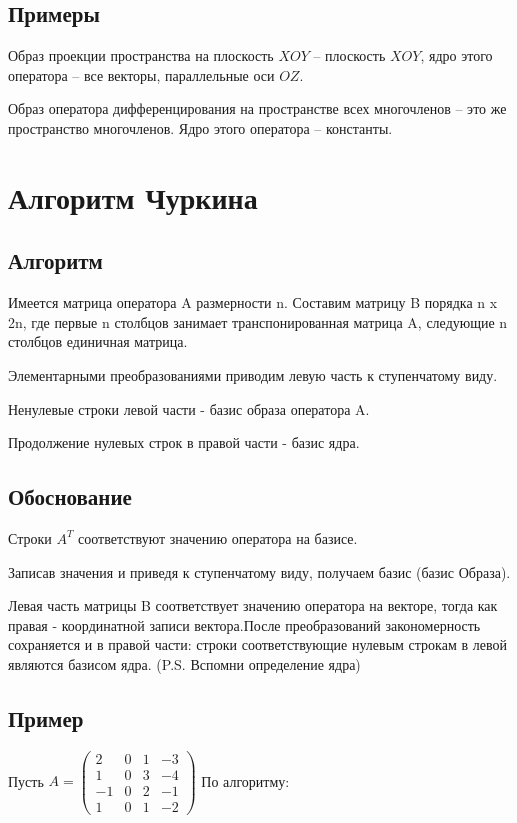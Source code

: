 \documentclass[12pt]{article}
\begin{document}
\subsection{Примеры}
Образ проекции пространства на плоскость $XOY$ – плоскость $XOY$, ядро этого оператора – все векторы, параллельные оси $OZ$.

Образ оператора дифференцирования на пространстве всех многочленов – это же пространство многочленов. Ядро этого оператора – константы.

\section{Алгоритм Чуркина}
\subsection{Алгоритм}
Имеется матрица оператора A размерности n. Составим матрицу B порядка n x 2n, где первые n столбцов занимает транспонированная матрица A, следующие n столбцов единичная матрица.

Элементарными преобразованиями приводим левую часть к ступенчатому виду.

Ненулевые строки левой части - базис образа оператора A.

Продолжение нулевых строк в правой части - базис ядра.

\subsection{Обоснование}
Строки $A^T$ соответствуют значению оператора на базисе.

Записав значения и приведя к ступенчатому виду, получаем базис (базис Образа).

Левая часть матрицы B соответствует значению оператора на векторе, тогда как правая - координатной записи вектора.После преобразований закономерность сохраняется и в правой части: строки соответствующие нулевым строкам в левой являются базисом ядра. (P.S. Вспомни определение ядра)

\subsection{Пример}
Пусть $A = \left(\begin{array}{cccc}
            2  & 0 & 1 & -3 \\
            1  & 0 & 3 & -4 \\
            -1 & 0 & 2 & -1 \\
            1  & 0 & 1 & -2
        \end{array} \right)$
По алгоритму:
\end{document}
